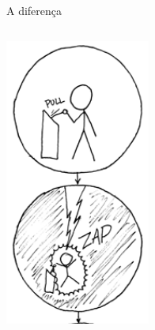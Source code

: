 \documentclass{beamer}
\begin{document}
\begin{frame}{A diferença}
  \begin{columns}
    \begin{column}{5cm}
      \begin{center}
        \includegraphics[width=0.55\textwidth]{Intro/the_difference1}
      \end{center}
    \end{column}
    \begin{column}{5cm}
      \begin{center}
        \begin{center}

\end{center}
\end{center}
\end{column}
\end{columns}
\end{frame}
\end{document}
